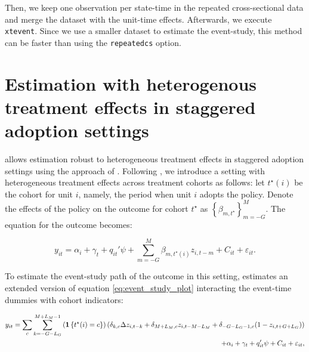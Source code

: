 \documentclass[12pt]{article}
\begin{document}
Then, we keep one observation per state-time in the repeated cross-sectional data and merge the dataset with the unit-time effects.
Afterwards, we execute \texttt{xtevent}.
Since we use a smaller dataset to estimate the event-study, this method can be faster than using the \texttt{repeatedcs} option.

\begin{stlog}
\nullskip
\end{stlog}


\section{Estimation with heterogenous treatment effects in staggered adoption settings}
\label{sec:sunabraham}

\xtevent allows estimation robust to heterogeneous treatment effects in staggered adoption settings using the approach of \cite{sun2021estimating}.
Following \cite{freyaldenhoven2021visualization}, we introduce a setting with heterogeneous treatment effects across treatment cohorts as follows:
let $t^{\star} (i)$ be the cohort for unit $i$, namely, the period when unit $i$ adopts the policy.
Denote the effects of the policy on the outcome for cohort $t^{\star}$ as $\left\{ \beta_{m,t^{\star}} \right\}_{m=-G}^M$.
The equation for the outcome becomes:

\begin{equation*}
y_{it} =  \alpha_{i} + \gamma_{t} + q_{it}'\psi  + \sum_{m=-G}^{M}\beta_{m,t^{\star}(i)} z_{i,t-m} + C_{it} + \varepsilon_{it}.
\end{equation*}

To estimate the event-study path of the outcome in this setting, \xtevent estimates an extended version of equation \eqref{eq:event_study_plot} interacting the event-time dummies with cohort indicators:

\begin{equation}
    \begin{split}
        y_{it} = \sum_{c} \sum_{k=-G-L_G}^{M+L_M -1} \left(  \mathbf{1}\left\{ t^{\star} (i) = c \right\} \right) \left( \delta_{k,c} \Delta  z_{i,t-k} + \delta_{M+L_M,c} z_{i,t-M-L_M} + \delta_{-G-L_G-1,c}(1-z_{i,t+G+L_G}) \right)
        \\ \centering
        + \alpha_{i} + \gamma_{t} + q'_{it}\psi + C_{it} + \varepsilon_{it},
    \end{split}
    \label{eq:sunabraham}
\end{equation}
\end{document}
